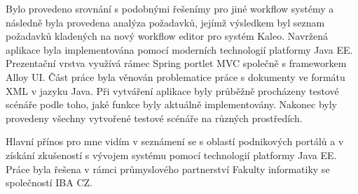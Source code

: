\documentclass{fithesis}
\begin{document}
Bylo provedeno srovnání s podobnými řešenímy pro jiné workflow systémy a následně byla provedena analýza požadavků, jejímž výsledkem byl seznam požadavků kladených na nový workflow editor pro systém Kaleo. Navržená aplikace byla implementována pomocí moderních technologií platformy Java EE. Prezentační vrstva využívá rámec Spring portlet MVC společně s frameworkem Alloy UI. Část práce byla věnován problematice práce s dokumenty ve formátu XML v jazyku Java. Při vytváření aplikace byly průběžně procházeny testové scénáře podle toho, jaké funkce byly aktuálně implementovány. Nakonec byly provedeny všechny vytvořené testové scénáře na různých prostředích.

Hlavní přínos pro mne vidím v seznámení se s oblastí podnikových portálů a v získání zkušeností s vývojem systému pomocí technologií platformy Java EE. Práce byla řešena v rámci průmyslového partnerství Fakulty informatiky se společností IBA CZ.




\end{document}
